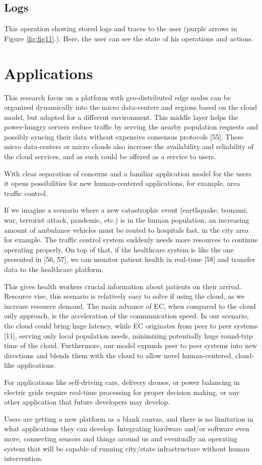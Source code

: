 \subsection{Logs}\label{sec:logs} 
This operation showing stored logs and traces to the user (purple arrows in Figure \ref{fig:fig11}.). Here, the user can see the state of his operations and actions.
%
%
\section{Applications}\label{sec:app}
%
This research focus on a platform with geo-distributed edge nodes can be organized dynamically into the micro data-centers and regions based on the cloud model, but adapted for a different environment. This middle layer helps the power-hungry servers reduce traffic by serving the nearby population requests and possibly syncing their data without expensive consensus protocols [55]. These micro data-centers or micro clouds also increase the availability and reliability of the cloud services, and as such could be offered as a service to users.

With clear separation of concerns and a familiar application model for the users it opens possibilities for new human-centered applications, for example, area traffic control. 

If we imagine a scenario where a new catastrophic event (earthquake, tsunami, war, terrorist attack, pandemic, etc.) is in the human population, an increasing amount of ambulance vehicles must be routed to hospitals fast, in the city area for example. The traffic control system suddenly needs more resources to continue operating properly. On top of that, if the healthcare system is like the one presented in [56, 57], we can monitor patient health in real-time [58] and transfer data to the healthcare platform. 

This gives health workers crucial information about patients on their arrival. Resource vise, this scenario is relatively easy to solve if using the cloud, as we increase resource demand. The main advance of EC, when compared to the cloud only approach, is the acceleration of the communication speed. In our scenario, the cloud could bring huge latency, while EC originates from peer to peer systems [11], serving only local population needs, minimizing potentially huge round-trip time of the cloud. Furthermore, our model expands peer to peer systems into new directions and blends them with the cloud to allow novel human-centered, cloud-like applications. 

For applications like self-driving cars, delivery drones, or power balancing in electric grids require real-time processing for proper decision making, or any other application that future developers may develop.

Users are getting a new platform as a blank canvas, and there is no limitation in what applications they can develop. Integrating hardware and/or software even more, connecting sensors and things around us and eventually an operating system that will be capable of running city/state infrastructure without human intervention.


%
%